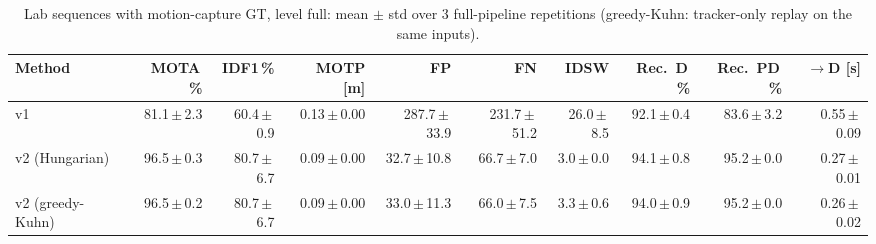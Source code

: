 \begin{table}[t]
\centering
\caption{Lab sequences with motion-capture GT, level full: mean $\pm$ std over 3 full-pipeline repetitions (greedy-Kuhn: tracker-only replay on the same inputs).}
\label{tab:own_r8_full_reps}
\setlength{\tabcolsep}{3pt}
\begin{tabular}{lrrrrrrrrr}
\toprule
Method & MOTA\,\% & IDF1\,\% & MOTP [m] & FP & FN & IDSW & Rec.\ D\,\% & Rec.\ PD\,\% & $\to$D [s] \\
\midrule
v1 & 81.1\,$\pm$\,2.3 & 60.4\,$\pm$\,0.9 & 0.13\,$\pm$\,0.00 & 287.7\,$\pm$\,33.9 & 231.7\,$\pm$\,51.2 & 26.0\,$\pm$\,8.5 & 92.1\,$\pm$\,0.4 & 83.6\,$\pm$\,3.2 & 0.55\,$\pm$\,0.09 \\
v2 (Hungarian) & 96.5\,$\pm$\,0.3 & 80.7\,$\pm$\,6.7 & 0.09\,$\pm$\,0.00 & 32.7\,$\pm$\,10.8 & 66.7\,$\pm$\,7.0 & 3.0\,$\pm$\,0.0 & 94.1\,$\pm$\,0.8 & 95.2\,$\pm$\,0.0 & 0.27\,$\pm$\,0.01 \\
v2 (greedy-Kuhn) & 96.5\,$\pm$\,0.2 & 80.7\,$\pm$\,6.7 & 0.09\,$\pm$\,0.00 & 33.0\,$\pm$\,11.3 & 66.0\,$\pm$\,7.5 & 3.3\,$\pm$\,0.6 & 94.0\,$\pm$\,0.9 & 95.2\,$\pm$\,0.0 & 0.26\,$\pm$\,0.02 \\
\bottomrule
\end{tabular}
\end{table}
